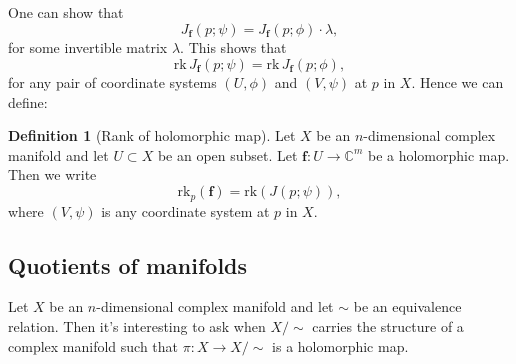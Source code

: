 \documentclass{article}
\theoremstyle{definition}
\newtheorem{defi}{Definition}
\begin{document}
One can show that
\[J_\mathbf{f}(p;\psi)=J_\mathbf{f}(p;\phi)\cdot\lambda,\]
for some invertible matrix $\lambda$. This shows that
\[\mathrm{rk}\,J_\mathbf{f}(p;\psi)=\mathrm{rk}\,J_\mathbf{f}(p;\phi),\]
for any pair of coordinate systems $(U,\phi)$ and $(V,\psi)$ at $p$ in $X$. Hence we can define:
\begin{defi}[Rank of holomorphic map]
  Let $X$ be an $n$-dimensional complex manifold and let $U\subset X$ be an open subset. Let $\mathbf{f}:U\to\mathbb{C}^m$ be a holomorphic map. Then we write
  \[\mathrm{rk}_p(\mathbf{f})=\mathrm{rk}(J(p;\psi)),\]
  where $(V,\psi)$ is any coordinate system at $p$ in $X$.
\end{defi}
\subsection{Quotients of manifolds}
Let $X$ be an $n$-dimensional complex manifold and let $\sim$ be an equivalence relation. Then it's interesting to ask when $X/{\sim}$ carries the structure of a complex manifold such that $\pi:X\to X/{\sim}$ is a holomorphic map.
\end{document}
